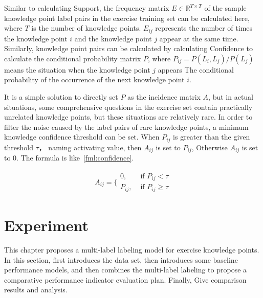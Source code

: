 Similar to calculating Support, the frequency matrix \(E\in \mathbb{R}^{T\times T}\) of the sample knowledge point label pairs in the exercise training set can be calculated here, where \(T\) is the number of knowledge points. \(E_{ij}\) represents the number of times the knowledge point \(i\) and the knowledge point \(j\) appear at the same time. Similarly, knowledge point pairs can be calculated by calculating Confidence to calculate the conditional probability matrix \(P\), where \(P_{ij}=P(L_i, L_j)/P(L_j)\) means the situation when the knowledge point \(j\) appears The conditional probability of the occurrence of the next knowledge point \(i\).

It is a simple solution to directly set \(P\) as the incidence matrix \(A\), but in actual situations, some comprehensive questions in the exercise set contain practically unrelated knowledge points, but these situations are relatively rare. In order to filter the noise caused by the label pairs of rare knowledge points, a minimum knowledge confidence threshold can be set. When \(P_{ij}\) is greater than the given threshold \(\tau \)， naming activating value, then \(A_{ij}\) is set to \(P_{ij}\), Otherwise \(A_{ij}\) is set to 0. The formula is like~\ref{fml:confidence}.

\begin{align}
	A_{i j}=\{\begin{array}{ll}
		0,      & \text{ if } P_{i j}<\tau      \\
		P_{ij}, & \text{ if } P_{i j} \geq \tau
	\end{array}\label{fml:confidence}
\end{align}

\section{Experiment}
This chapter proposes a multi-label labeling model for exercise knowledge points. In this section, first introduces the data set, then introduces some baseline performance models, and then combines the multi-label labeling to propose a comparative performance indicator evaluation plan. Finally, Give comparison results and analysis.
